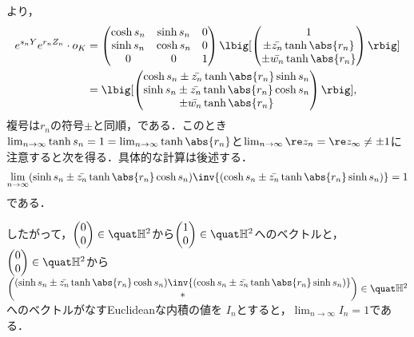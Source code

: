 \begin{npfwn}
  より， 
  \begin{align*}
    e^{s_n Y}e^{r_n Z_n}\cdot o_K &=
    \begin{pmatrix}
      \cosh s_n & \sinh s_n & 0 \\
      \sinh s_n & \cosh s_n & 0 \\
      0 & 0 & 1 
    \end{pmatrix}
              \lbig[\begin{pmatrix}
                1\\ \pm \bar{z_n} \tanh \abs{r_n}  \\ \pm \bar{w_n} \tanh \abs{r_n}
              \end{pmatrix}\rbig]\\
    &=  \lbig[ \begin{pmatrix}
      \cosh s_n \pm \bar{z_n} \tanh \abs{r_n} \sinh s_n \\ \sinh s_n \pm \bar{z_n} \tanh \abs{r_n} \cosh s_n \\ \pm \bar{w_n} \tanh \abs{r_n}
    \end{pmatrix}\rbig],
  \end{align*}
  複号は$r_n$の符号$\pm$と同順，である．このとき$\lim_{n\to \infty}\tanh s_n = 1 = \lim_{n\to \infty}\tanh \abs{r_n} $と$\lim_{n\to \infty} \re z_n = \re z_{\infty} \neq \pm 1$に注意すると次を得る．具体的な計算は後述する．
  \begin{align}
    \lim_{n\to \infty}(\sinh s_n \pm \bar{z_n} \tanh \abs{r_n} \cosh s_n)\inv{(\cosh s_n \pm \bar{z_n} \tanh \abs{r_n} \sinh s_n) } = 1\label{eq:-1}
  \end{align}
  である．

  したがって，$
  \begin{pmatrix}
    0 \\ 0 
  \end{pmatrix}
  \in \quat\mathbb{H}^2 $から$
  \begin{pmatrix}
    1 \\ 0 
  \end{pmatrix}
  \in \quat\mathbb{H}^2 $へのベクトルと，$
  \begin{pmatrix}
    0 \\ 0 
  \end{pmatrix}
  \in \quat\mathbb{H}^2 $から\\
  $ \begin{pmatrix}
    (\sinh s_n \pm \bar{z_n} \tanh \abs{r_n} \cosh s_n)\inv{(\cosh s_n \pm \bar{z_n} \tanh \abs{r_n} \sinh s_n) } \\  \ast 
  \end{pmatrix}\in \quat\mathbb{H}^2 $へのベクトルがなすEuclideanな内積の値を $I_n$とすると，$\lim_{n\to \infty}I_n = 1 $である．


\end{npfwn}
